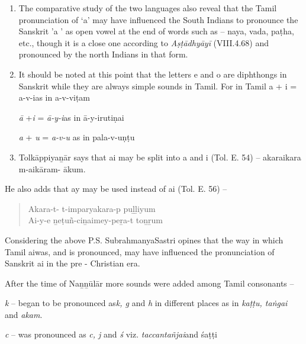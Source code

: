 \begin{enumerate}[{\rm 1)}]
\itemsep=0pt
\item The comparative study of the two languages also reveal that the Tamil pronunciation of ‘a’ may have influenced the South Indians to pronounce the Sanskrit ’a ’ as open vowel at the end of words such as – naya, vada, paṭha, etc., though it is a close one according to \textit{Aṣṭādhyāyī} (VIII.4.68) and pronounced by the north Indians in that form.

 \item 
 It should be noted at this point that the letters e and o are diphthongs in Sanskrit while they are always simple sounds in Tamil. For in Tamil a + i = a-v-ias in a-v-viṭam

 \textit{ā} +\textit{i} = \textit{ā-y-i}as in ā-y-irutiṇai

 \textit{a} + \textit{u} = \textit{a-v-u} as in pala-v-uṇṭu

 \item Tolkāppiyaṉār says that ai may be split into a and i (Tol. E. 54) – akaraikara m-aikāram- ākum.

\end{enumerate}

He also adds that ay may be used instead of ai (Tol. E. 56) –

\begin{verse}
Akara-t- t-imparyakara-p puḻḻiyum\\ Ai-y-e ṉeṭuñ-ciṉaimey-peṟa-t toṉṟum
\end{verse}

Considering the above P.S. SubrahmanyaSastri opines that the way in which Tamil aiwas, and is pronounced, may have influenced the pronunciation of Sanskrit ai in the pre - Christian era.

After the time of Naṉṉūlār more sounds were added among Tamil consonants –

\begin{myquote}
\textit{k} – began to be pronounced as\textit{k, g} and \textit{h} in different places as in \textit{kaṭṭu, taṅgai} and \textit{akam}.
\end{myquote}

\begin{myquote}
\textit{c} – was pronounced as \textit{c, j} and \textit{ś} viz. \textit{taccantañjai}and śaṭṭi
\end{myquote}

